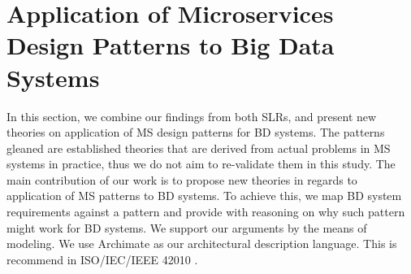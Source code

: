 \documentclass[a4paper,11pt,article,oneside]{memoir}
\begin{document}
        





        
        


        
        

        

        
        

        

             
        

        



\chapter{Application of Microservices Design Patterns to Big Data Systems}


In this section, we combine our findings from both SLRs, and present new theories on application of MS design patterns for BD systems. The patterns gleaned are established theories that are derived from actual problems in MS systems in practice, thus we do not aim to re-validate them in this study. The main contribution of our work is to propose new theories in regards to application of MS patterns to BD systems. To achieve this, we map BD system requirements against a pattern and provide with reasoning on why such pattern might work for BD systems. We support our arguments by the means of modeling. We use Archimate as our architectural description language. This is recommend in ISO/IEC/IEEE 42010 \citep{Chaabane}. 
\end{document}
